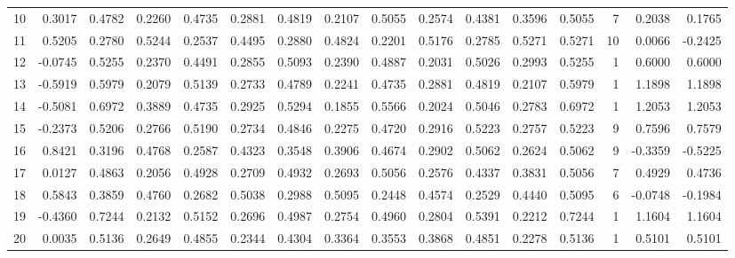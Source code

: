 \begin{tabular}{lrrrrrrrrrrrrrrr}
10  &      0.3017 &  0.4782 &  0.2260 &  0.4735 &  0.2881 &  0.4819 &  0.2107 &  0.5055 &  0.2574 &  0.4381 &   0.3596 &     0.5055 &      7 &                    0.2038 &                     0.1765 \\
11  &      0.5205 &  0.2780 &  0.5244 &  0.2537 &  0.4495 &  0.2880 &  0.4824 &  0.2201 &  0.5176 &  0.2785 &   0.5271 &     0.5271 &     10 &                    0.0066 &                    -0.2425 \\
12  &     -0.0745 &  0.5255 &  0.2370 &  0.4491 &  0.2855 &  0.5093 &  0.2390 &  0.4887 &  0.2031 &  0.5026 &   0.2993 &     0.5255 &      1 &                    0.6000 &                     0.6000 \\
13  &     -0.5919 &  0.5979 &  0.2079 &  0.5139 &  0.2733 &  0.4789 &  0.2241 &  0.4735 &  0.2881 &  0.4819 &   0.2107 &     0.5979 &      1 &                    1.1898 &                     1.1898 \\
14  &     -0.5081 &  0.6972 &  0.3889 &  0.4735 &  0.2925 &  0.5294 &  0.1855 &  0.5566 &  0.2024 &  0.5046 &   0.2783 &     0.6972 &      1 &                    1.2053 &                     1.2053 \\
15  &     -0.2373 &  0.5206 &  0.2766 &  0.5190 &  0.2734 &  0.4846 &  0.2275 &  0.4720 &  0.2916 &  0.5223 &   0.2757 &     0.5223 &      9 &                    0.7596 &                     0.7579 \\
16  &      0.8421 &  0.3196 &  0.4768 &  0.2587 &  0.4323 &  0.3548 &  0.3906 &  0.4674 &  0.2902 &  0.5062 &   0.2624 &     0.5062 &      9 &                   -0.3359 &                    -0.5225 \\
17  &      0.0127 &  0.4863 &  0.2056 &  0.4928 &  0.2709 &  0.4932 &  0.2693 &  0.5056 &  0.2576 &  0.4337 &   0.3831 &     0.5056 &      7 &                    0.4929 &                     0.4736 \\
18  &      0.5843 &  0.3859 &  0.4760 &  0.2682 &  0.5038 &  0.2988 &  0.5095 &  0.2448 &  0.4574 &  0.2529 &   0.4440 &     0.5095 &      6 &                   -0.0748 &                    -0.1984 \\
19  &     -0.4360 &  0.7244 &  0.2132 &  0.5152 &  0.2696 &  0.4987 &  0.2754 &  0.4960 &  0.2804 &  0.5391 &   0.2212 &     0.7244 &      1 &                    1.1604 &                     1.1604 \\
20  &      0.0035 &  0.5136 &  0.2649 &  0.4855 &  0.2344 &  0.4304 &  0.3364 &  0.3553 &  0.3868 &  0.4851 &   0.2278 &     0.5136 &      1 &                    0.5101 &                     0.5101 \\

\end{tabular}
